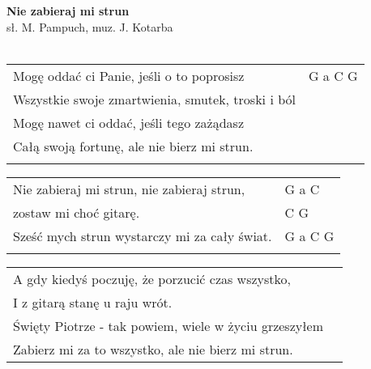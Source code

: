 \documentclass[a5paper]{article}
\begin{document}


\noindent
\fontsize{12pt}{15pt}\selectfont
\textbf{Nie zabieraj mi strun} \\
\fontsize{8pt}{10pt}\selectfont
sł. M. Pampuch, muz. J. Kotarba \\ \\
\fontsize{10pt}{12pt}\selectfont
{}
\begin{tabular}{@{}p{9.00cm}p{3cm}@{}}
\noindent
Mogę oddać ci Panie, jeśli o to poprosisz & G a C G \\
Wszystkie swoje zmartwienia, smutek, troski i ból \\
Mogę nawet ci oddać, jeśli tego zażądasz \\
Całą swoją fortunę, ale nie bierz mi strun. \\ \\
\end{tabular}

\noindent
\begin{tabular}{@{}p{8.00cm}p{3cm}@{}}
Nie zabieraj mi strun, nie zabieraj strun, & G a C \\
zostaw mi choć gitarę. & C G \\
Sześć mych strun wystarczy mi za cały świat. & G a C G \\ \\
\end{tabular}

\noindent
\begin{tabular}{@{}p{9.50cm}p{3cm}@{}}
A gdy kiedyś poczuję, że porzucić czas wszystko, \\
I z gitarą stanę u raju wrót. \\
Święty Piotrze - tak powiem, wiele w życiu grzeszyłem \\
Zabierz mi za to wszystko, ale nie bierz mi strun.
\end{tabular}
\end{document}
